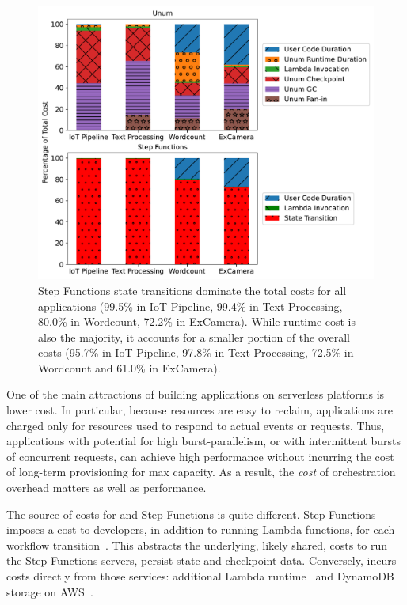 \begin{figure}[t!]
    \centering
    \includegraphics[width=\columnwidth]{figures/AppCostBreakdown.pdf}
    \caption{Step Functions state transitions dominate the total costs for all
    applications (99.5\% in IoT Pipeline, 99.4\% in Text Processing, 80.0\% in
    Wordcount, 72.2\% in ExCamera). While \name{} runtime cost is also the
    majority, it accounts for a smaller portion of the overall costs (95.7\%
    in IoT Pipeline, 97.8\% in Text Processing, 72.5\%
    in Wordcount and 61.0\% in ExCamera).}
    \label{fig:cost-breakdown}
\end{figure}

One of the main attractions of building applications on serverless platforms
is lower cost. In particular, because resources are easy to reclaim,
applications are charged only for resources used to respond to actual events
or requests. Thus, applications with potential for high burst-parallelism, or
with intermittent bursts of concurrent requests, can achieve high performance
without incurring the cost of long-term provisioning for max capacity. As a
result, the \emph{cost} of orchestration overhead matters as well as
performance.

The source of costs for \name{} and Step Functions is quite different. Step
Functions imposes a cost to developers, in addition to running Lambda
functions, for each workflow
transition~\cite{aws-step-functions-pricing}. This abstracts the underlying, likely shared, costs to run the
Step Functions servers, persist state and checkpoint data. Conversely, \name{}
incurs costs directly from those services: additional Lambda
runtime~\cite{aws-lambda-pricing} and DynamoDB storage on
AWS~\cite{dynamodb-pricing}.

